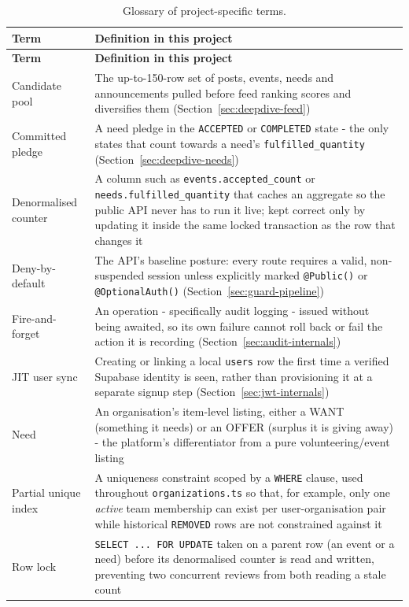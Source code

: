 \begin{longtable}{|p{}|>{\raggedright\arraybackslash}p{}|}
\caption{Glossary of project-specific terms.}\\\hline
\textbf{Term} & \textbf{Definition in this project}\\\hline
\endfirsthead\hline\textbf{Term} & \textbf{Definition in this project}\\\hline\endhead
Candidate pool & The up-to-150-row set of posts, events, needs and announcements pulled before feed ranking scores and diversifies them (Section~\ref{sec:deepdive-feed})\\\hline
Committed pledge & A need pledge in the \texttt{ACCEPTED} or \texttt{COMPLETED} state - the only states that count towards a need's \texttt{fulfilled\_quantity} (Section~\ref{sec:deepdive-needs})\\\hline
Denormalised counter & A column such as \texttt{events.accepted\_count} or \texttt{needs.fulfilled\_quantity} that caches an aggregate so the public API never has to run it live; kept correct only by updating it inside the same locked transaction as the row that changes it\\\hline
Deny-by-default & The API's baseline posture: every route requires a valid, non-suspended session unless explicitly marked \texttt{@Public()} or \texttt{@OptionalAuth()} (Section~\ref{sec:guard-pipeline})\\\hline
Fire-and-forget & An operation - specifically audit logging - issued without being awaited, so its own failure cannot roll back or fail the action it is recording (Section~\ref{sec:audit-internals})\\\hline
JIT user sync & Creating or linking a local \texttt{users} row the first time a verified Supabase identity is seen, rather than provisioning it at a separate signup step (Section~\ref{sec:jwt-internals})\\\hline
Need & An organisation's item-level listing, either a WANT (something it needs) or an OFFER (surplus it is giving away) - the platform's differentiator from a pure volunteering/event listing\\\hline
Partial unique index & A uniqueness constraint scoped by a \texttt{WHERE} clause, used throughout \texttt{organizations.ts} so that, for example, only one \emph{active} team membership can exist per user-organisation pair while historical \texttt{REMOVED} rows are not constrained against it\\\hline
Row lock & \texttt{SELECT ... FOR UPDATE} taken on a parent row (an event or a need) before its denormalised counter is read and written, preventing two concurrent reviews from both reading a stale count\\\hline

\end{longtable}
